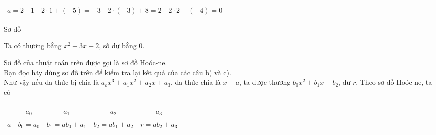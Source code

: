 \begin{enumerate}
\begin{center}
\begin{tabular}{c|c|c|c|c}
		\hline 
		\hspace{0.5cm} $a=2$\hspace{0.5cm}	&\hspace{1cm} $1$\hspace{1cm}  & $2\cdot 1+(-5)=-3$  & $2\cdot (-3)+8=2$  & $2\cdot 2+(-4)=0$
	\end{tabular} 
\end{center}
Sơ đồ
\begin{center}
\end{center}

Ta có thương bằng $x^2-3x+2$, số dư bằng $0$.
\end{enumerate}
Sơ đồ của thuật toán trên được gọi là sơ đồ Hoóc-ne.\\
Bạn đọc hãy dùng sơ đồ trên để kiểm tra lại kết quả của các câu b) và c).\\
Như vậy nếu đa thức bị chia là $a_ox^3+a_1x^2+a_2x+a_3$, đa thức chia là $x-a$, ta được thương $b_0x^2+b_1x+b_2$, dư $r$. Theo sơ đồ Hoóc-ne, ta có
\begin{center}
	\begin{tabular}{c|c|c|c|c}
		&\hspace{1cm} $a_0$\hspace{1cm} & \hspace{1cm} $a_1$\hspace{1cm}  &\hspace{1cm} $a_2$ \hspace{1cm}  & \hspace{1cm} $a_3$ \hspace{1cm}  \\ 
		\hline 
		\hspace{1cm} $a$\hspace{1cm}	& $b_0=a_0$  & $b_1=ab_0+a_1$  & $b_2=ab_1+a_2$  & $r=ab_2+a_3$
	\end{tabular} 
\end{center}
